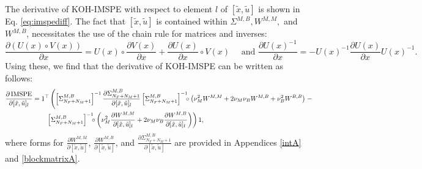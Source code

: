 \documentclass[
]{article}
\begin{document}
The derivative of KOH-IMSPE with respect to element \(l\) of \([\tilde{x}, \tilde{u}]\) is shown in Eq. \eqref{eq:imspediff}. The fact that \([\tilde{x}, \tilde{u}]\) is contained within \(\Sigma^{M,B}, W^{M,M},\) and \(W^{M,B}\), necessitates the use of the chain rule for matrices and inverses:
\[
\frac{\partial(U(x)\circ V(x))}{\partial x} = U(x)\circ\frac{\partial V(x)}{\partial x} + \frac{\partial U(x)}{\partial x}\circ V(x) \quad \mbox{ and } \frac{\partial U(x)^{-1}}{\partial x} = -U(x)^{-1}\frac{\partial  U(x)}{\partial x}U(x)^{-1}.
\]
Using these, we find that the derivative of KOH-IMSPE can be written as follows:
\begin{align}
\frac{\partial \, \mathrm{IMSPE}}{\partial  [\tilde{x}, \tilde{u}]_l} &= 1^{\top}\left(\left[\Sigma^{M, B}_{N_F + N_M +1}\right]^{-1}\frac{\partial \Sigma^{M, B}_{N_F + N_M + 1}}{\partial [\tilde{x}, \tilde{u}]_l}\left[\Sigma^{M, B}_{N_F + N_M + 1}\right]^{-1}\!\!\!\circ \left(\nu_M^2 W^{M,M} + 2\nu_M\nu_B W^{M,B} + \nu_B^2 W^{B,B}  \right)\right. - \notag \\
& \qquad \left. \left[\Sigma^{M, B}_{N_F + N_M + 1}\right]^{-1}\!\!\!\circ \left( \nu_M^2 \frac{\partial W^{M,M}}{\partial[\tilde{x}, \tilde{u}]_l} + 2\nu_M\nu_B \frac{\partial W^{M,B}}{\partial[\tilde{x}, \tilde{u}]_l} \right)\right)1,
\label{eq:imspediff}
\end{align}
where forms for \(\frac{\partial W^{M,M}}{\partial [\tilde{x},\tilde{u}]}\), \(\frac{\partial W^{M,B}}{\partial [\tilde{x},\tilde{u}]}\), and \(\frac{\partial\Sigma^{M, B}_{N_F + N_M + 1} }{\partial[\tilde{x}, \tilde{u}]}\) are provided in Appendices \ref{intA} and \ref{blockmatrixA}.
\end{document}
